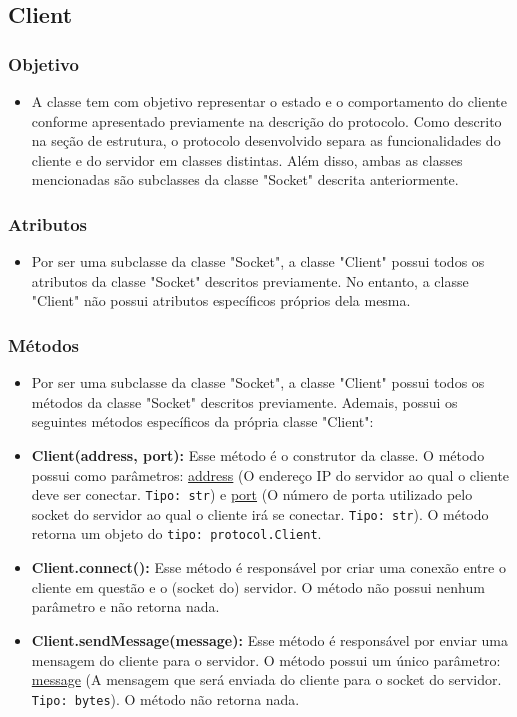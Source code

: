 \documentclass[10pt]{article}
\begin{document}
\begin{itemize}
    \subsection{\Large Client}
        \subsubsection{\large Objetivo}
            \begin{itemize}
            \item A classe tem com objetivo representar o estado e o comportamento do cliente conforme apresentado previamente na descrição do protocolo. Como descrito na seção de estrutura, o protocolo desenvolvido separa as funcionalidades do cliente e do servidor em classes distintas. Além disso, ambas as classes mencionadas são subclasses da classe "Socket" descrita anteriormente.
            \end{itemize}
        \subsubsection{\large Atributos}
            \begin{itemize}
            \item Por ser uma subclasse da classe "Socket", a classe "Client" possui todos os atributos da classe "Socket" descritos previamente. No entanto, a classe "Client" não possui atributos específicos próprios dela mesma.
            \end{itemize}
        \subsubsection{\large Métodos}
            \begin{itemize}
            \item Por ser uma subclasse da classe "Socket", a classe "Client" possui todos os métodos da classe "Socket" descritos previamente. Ademais, possui os seguintes métodos específicos da própria classe "Client":
            \item \textbf{Client(address, port):} Esse método é o construtor da classe. O método possui como parâmetros: \underline{address} (O endereço IP do servidor ao qual o cliente deve ser conectar. \texttt{Tipo: str}) e \underline{port} (O número de porta utilizado pelo socket do servidor ao qual o cliente irá se conectar. \texttt{Tipo: str}).  O método retorna um objeto do \texttt{tipo: protocol.Client}.
            \item \textbf{Client.connect():} Esse método é responsável por criar uma conexão entre o cliente em questão e o (socket do) servidor. O método não possui nenhum parâmetro e não retorna nada.
            \item \textbf{Client.sendMessage(message):} Esse método é responsável por enviar uma mensagem do cliente para o servidor. O método possui um único parâmetro: \underline{message} (A mensagem que será enviada do cliente para o socket do servidor. \texttt{Tipo: bytes}). O método não retorna nada.
            \end{itemize}
        

\end{itemize}
\end{document}
